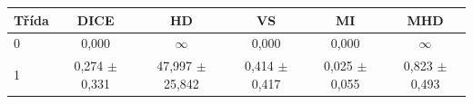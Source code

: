 \begin{tabular}{l c c c c c}
 \hline
Třída & DICE & HD & VS & MI & MHD \\ \hline
0 & 0,000 & $\infty$ & 0,000 & 0,000 & $\infty$ \\
1 & 0,274 $\pm$ 0,331 & 47,997 $\pm$ 25,842 & 0,414 $\pm$ 0,417 & 0,025 $\pm$ 0,055 & 0,823 $\pm$ 0,493 \\
\hline 
 \end{tabular}
